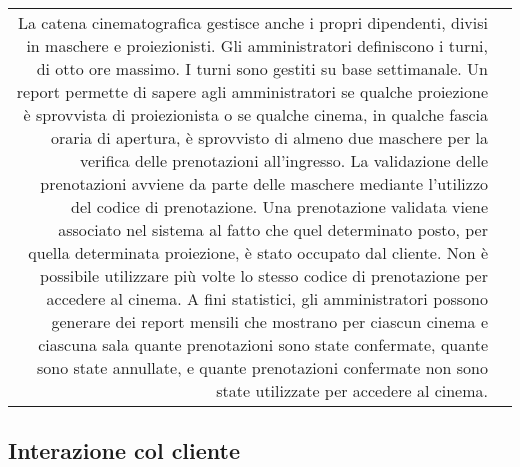 \begin{tabularx}{\linewidth}{r|>{\internallinenumbers}X|}
      La catena cinematografica gestisce anche i propri dipendenti, divisi in
      maschere e proiezionisti.
      Gli amministratori definiscono i turni, di otto ore massimo.
      I turni sono gestiti su base settimanale.
      Un report permette di sapere agli amministratori se qualche proiezione
      è sprovvista di proiezionista o se qualche cinema, in qualche
      fascia oraria di apertura, è sprovvisto di almeno due maschere per la
      verifica delle prenotazioni all’ingresso.
      \newline
      \newline
      La validazione delle prenotazioni avviene da parte delle maschere
      mediante l’utilizzo del codice di prenotazione.
      Una prenotazione validata viene associato nel sistema al fatto che quel
      determinato posto, per quella determinata proiezione, è stato occupato
      dal cliente.
      Non è possibile utilizzare più volte lo stesso codice di prenotazione
      per accedere al cinema.
      \newline
      \newline
      A fini statistici, gli amministratori possono generare dei report mensili
      che mostrano per ciascun cinema e ciascuna sala quante prenotazioni sono
      state confermate, quante sono state annullate, e quante prenotazioni
      confermate non sono state utilizzate per accedere al cinema.
      \\\cline{2-2}
\end{tabularx}

\pagebreak

\subsection*{Interazione col cliente}


